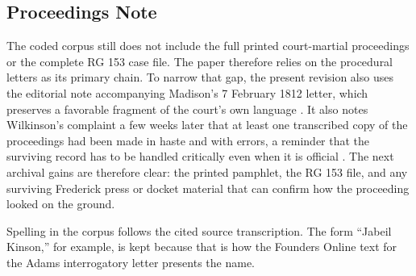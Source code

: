 \subsection*{Proceedings Note}

The coded corpus still does not include the full printed court-martial proceedings or the complete RG 153 case file. The paper therefore relies on the procedural letters as its primary chain. To narrow that gap, the present revision also uses the editorial note accompanying Madison's 7 February 1812 letter, which preserves a favorable fragment of the court's own language \citep{madison1812}. It also notes Wilkinson's complaint a few weeks later that at least one transcribed copy of the proceedings had been made in haste and with errors, a reminder that the surviving record has to be handled critically even when it is official \citep{madison1812copy}. The next archival gains are therefore clear: the printed pamphlet, the RG 153 file, and any surviving Frederick press or docket material that can confirm how the proceeding looked on the ground.

Spelling in the corpus follows the cited source transcription. The form ``Jabeil Kinson,'' for example, is kept because that is how the Founders Online text for the Adams interrogatory letter presents the name.
